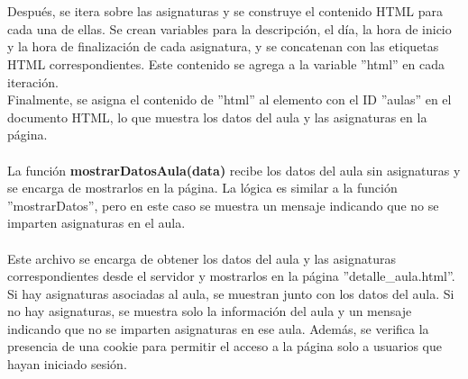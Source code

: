 \documentclass[12pt]{report}
\begin{document}
\\\\
Después, se itera sobre las asignaturas y se construye el contenido HTML para cada una de ellas. Se crean variables para la descripción, el día, la hora de inicio y la hora de finalización de cada asignatura, y se concatenan con las etiquetas HTML correspondientes. Este contenido se agrega a la variable ''html'' en cada iteración.
\\
Finalmente, se asigna el contenido de ''html'' al elemento con el ID ''aulas'' en el documento HTML, lo que muestra los datos del aula y las asignaturas en la página.
\\\\
La función \textbf{mostrarDatosAula(data)} recibe los datos del aula sin asignaturas y se encarga de mostrarlos en la página. La lógica es similar a la función ''mostrarDatos'', pero en este caso se muestra un mensaje indicando que no se imparten asignaturas en el aula.
\\\\
Este archivo se encarga de obtener los datos del aula y las asignaturas correspondientes desde el servidor y mostrarlos en la página ''detalle\_aula.html''. Si hay asignaturas asociadas al aula, se muestran junto con los datos del aula. Si no hay asignaturas, se muestra solo la información del aula y un mensaje indicando que no se imparten asignaturas en ese aula. Además, se verifica la presencia de una cookie para permitir el acceso a la página solo a usuarios que hayan iniciado sesión.
\end{document}
